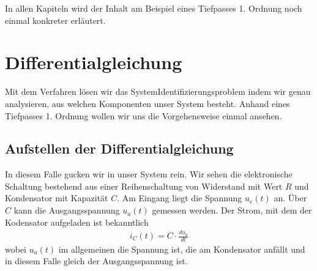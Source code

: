 \documentclass[letterpaper,10pt,english]{jupyterBook}
\begin{document}
\sphinxAtStartPar
In allen Kapiteln wird der Inhalt am Beispiel eines Tiefpasses 1. Ordnung noch einmal konkreter erläutert.

\sphinxAtStartPar
{}

\sphinxstepscope


\section{Differentialgleichung}
\label{\detokenize{content/5_DGL:differentialgleichung}}\label{\detokenize{content/5_DGL::doc}}
\sphinxAtStartPar
Mit dem \sphinxhyphen{}Verfahren lösen wir das System\sphinxhyphen{}Identifizierungsproblem indem wir genau analysieren, aus welchen Komponenten unser System besteht. Anhand eines Tiefpasses 1. Ordnung wollen wir uns die Vorgehensweise einmal ansehen.


\subsection{Aufstellen der Differentialgleichung}
\label{\detokenize{content/5_DGL:aufstellen-der-differentialgleichung}}
\sphinxAtStartPar

In diesem Falle gucken wir in unser System rein. Wir sehen die elektronische Schaltung bestehend aus einer Reihenschaltung von Widerstand mit Wert \(R\) und Kondensator mit Kapazität \(C\). Am Eingang liegt die Spannung \(u_e(t)\) an. Über \(C\) kann die Ausgangsspannung \(u_a(t)\) gemessen werden. Der Strom, mit dem der Kodensator aufgeladen ist bekanntlich
\begin{equation*}
\begin{split}i_C(t) = C\cdot \frac{du_a}{dt}\end{split}
\end{equation*}
\sphinxAtStartPar
wobei \(u_a(t)\) im allgemeinen die Spannung ist, die am Kondensator anfällt und in diesem Falle gleich der Ausgangsspannung ist.
\end{document}
